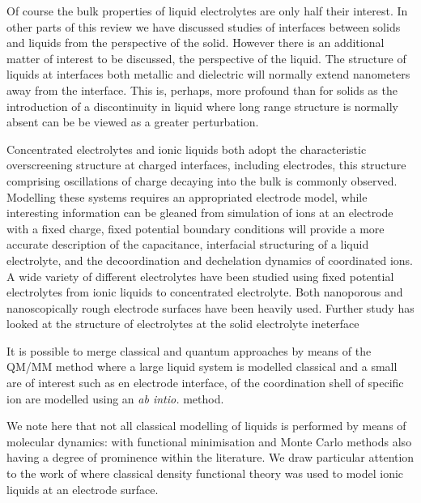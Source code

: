 \documentclass[../main.tex]{subfiles}
\begin{document}
Of course the bulk properties of liquid electrolytes are only half their interest. In other parts of this review we have discussed studies of interfaces between solids and liquids from the perspective of the solid. However there is an additional matter of interest to be discussed, the perspective of the liquid. The structure of liquids at interfaces both metallic and dielectric will normally extend nanometers away from the interface\cite{smith_electrostatic_2016}. This is, perhaps, more profound than for solids as the introduction of a discontinuity in liquid where long range structure is normally absent can be be viewed as a greater perturbation.

Concentrated electrolytes and ionic liquids both adopt the characteristic overscreening structure at charged interfaces, including electrodes, this structure comprising oscillations of charge decaying into the bulk is commonly observed\cite{coles_correlation_2020}. Modelling these systems requires an appropriated electrode model, while interesting information can be gleaned from simulation of ions at an electrode with a fixed charge, fixed potential boundary conditions will provide a more accurate description of the capacitance\cite{merlet_simulating_2013,scalfi_semiclassical_2020}, interfacial structuring of a liquid electrolyte\cite{coles_simulation_2019,vatamanu_ramifications_2017,li_capacitive_2018}, and the decoordination and dechelation dynamics of coordinated ions\cite{vatamanu_molecular_2009}. A wide variety of different electrolytes have been studied using fixed potential electrolytes from ionic liquids to concentrated electrolyte. Both nanoporous\cite{merlet_highly_2013,merlet_molecular_2012,vatamanu_molecular_2009,vatamanu_ramifications_2017} and nanoscopically rough electrode surfaces have been heavily used\cite{vatamanu_influence_2011}. Further study has looked at the structure of electrolytes at the solid electrolyte ineterface\cite{borodin_interfacial_2014}

It is possible to merge classical and quantum approaches by means of the QM/MM method where a large liquid system is modelled classical and a small are of interest such as en electrode interface, of the coordination shell of specific ion are modelled using an \textit{ab intio.} method.

We note here that not all classical modelling of liquids is performed by means of molecular dynamics: with functional minimisation and Monte Carlo methods also having a degree of prominence within the literature. We draw particular attention to the work of where classical density functional theory was used to model ionic liquids at an electrode surface.
\end{document}
